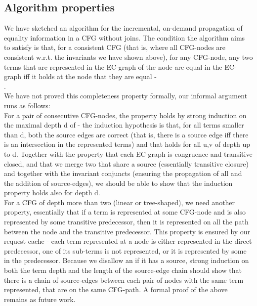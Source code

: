 




\subsection*{Algorithm properties}
We have sketched an algorithm for the incremental, on-demand propagation of equality information in a CFG without joins.
The condition the algorithm aims to satisfy is that, for a consistent CFG (that is, where all CFG-nodes are consistent w.r.t. the invariants we have shown above), for any CFG-node, any two terms that are represented in the EC-graph of the node are equal in the EC-graph iff it holds at the node that they are equal - \\
. \\
We have not proved this completeness property formally, our informal argument runs as follows:\\
For a pair of consecutive CFG-nodes, the property holds by strong induction on the maximal depth d of  - the induction hypothesis is that, for all terms smaller than d, both the source edges are correct (that is, there is a source edge iff there is an intersection in the represented terms) and that  holds for all u,v of depth up to d. 
Together with the property that each EC-graph is congruence and transitive closed, and that we merge two \GTs{} that share a source (essentially transitive closure) and together with the invariant conjuncts (ensuring the propagation of all \GFAs{} and the addition of source-edges), we should be able to show that the induction property holds also for depth d.\\
For a CFG of depth more than two (linear or tree-shaped), we need another property, essentially that if a term is represented at some CFG-node and is also represented by some transitive predecessor, then it is represented on all the path between the node and the transitive predecessor. This property is ensured by our request cache - each term represented at a node is either represented in the direct predecessor, one of its sub-terms is not represented, or it is represented by some \RGFA{} in the predecessor. 
Because we disallow an \RGFA{} if it has a \GT{} source, strong induction on both the term depth and the length of the source-edge chain should show that there is a chain of source-edges between each pair of nodes with the same term represented, that are on the same CFG-path.
A formal proof of the above remains as future work.

